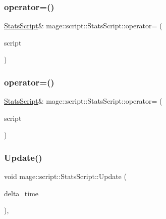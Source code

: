 \subsubsection{\texorpdfstring{operator=()}{operator=()}\hspace{0.1cm}{\footnotesize\ttfamily [1/2]}}
{\footnotesize\ttfamily \hyperlink{classmage_1_1script_1_1_stats_script}{Stats\+Script}\& mage\+::script\+::\+Stats\+Script\+::operator= (\begin{DoxyParamCaption}\item[{const \hyperlink{classmage_1_1script_1_1_stats_script}{Stats\+Script} \&}]{script }\end{DoxyParamCaption})\hspace{0.3cm}{\ttfamily [delete]}}

\hypertarget{classmage_1_1script_1_1_stats_script_a5eecd80eef17414d566c7d7c77b3dbce}{}\label{classmage_1_1script_1_1_stats_script_a5eecd80eef17414d566c7d7c77b3dbce} 
\subsubsection{\texorpdfstring{operator=()}{operator=()}\hspace{0.1cm}{\footnotesize\ttfamily [2/2]}}
{\footnotesize\ttfamily \hyperlink{classmage_1_1script_1_1_stats_script}{Stats\+Script}\& mage\+::script\+::\+Stats\+Script\+::operator= (\begin{DoxyParamCaption}\item[{\hyperlink{classmage_1_1script_1_1_stats_script}{Stats\+Script} \&\&}]{script }\end{DoxyParamCaption})\hspace{0.3cm}{\ttfamily [delete]}}

\hypertarget{classmage_1_1script_1_1_stats_script_a0af94632cf9d5c32ae45799a2348c571}{}\label{classmage_1_1script_1_1_stats_script_a0af94632cf9d5c32ae45799a2348c571} 
\subsubsection{\texorpdfstring{Update()}{Update()}}
{\footnotesize\ttfamily void mage\+::script\+::\+Stats\+Script\+::\+Update (\begin{DoxyParamCaption}\item[{\mbox{[}\mbox{[}maybe\+\_\+unused\mbox{]} \mbox{]} \hyperlink{namespacemage_ad26233bbec640deda836e572c1a23708}{F64}}]{delta\+\_\+time }\end{DoxyParamCaption})\hspace{0.3cm}{\ttfamily [override]}, {\ttfamily [virtual]}}

